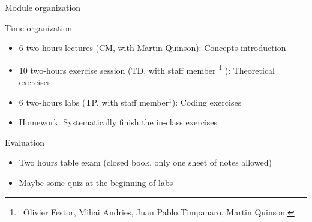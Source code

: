 \begin{frame}{Module organization}
  \begin{block}{Time organization}
    \begin{itemize}
    \item 6 two-hours lectures {\small(CM, with Martin Quinson)}: 
      Concepts introduction
    \item 10 two-hours exercise session {\small(TD, with staff member%
      \footnote{ ~Olivier Festor, Mihai Andries, Juan Pablo Timpanaro, Martin Quinson.}%
      )}: Theoretical exercises
    \item 6 two-hours labs {\small(TP, with staff member$^1$)}: 
      Coding exercises
    \item Homework: Systematically finish the in-class exercises
    \end{itemize}
  \end{block}

  \begin{block}{Evaluation}
    \begin{itemize}
    \item Two hours table exam (closed book, only one sheet of notes allowed)
    \item Maybe some quiz at the beginning of labs
    \end{itemize}
  \end{block}
\end{frame}


